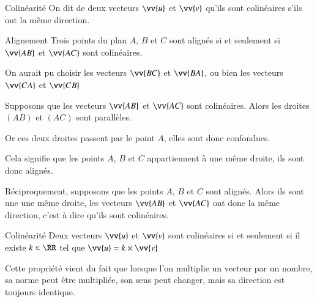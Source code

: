 \documentclass[oneside,12pt]{article}          %
\begin{document}
\begin{definition}{Colinéarité}
On dit de deux vecteurs $\vv{u}$ et $\vv{v}$ qu'ils sont colinéaires s'ils ont la même direction.
\end{definition}



\begin{minipage}{0.48\linewidth}
    \begin{propriete}{Alignement}
	    Trois points du plan $A$, $B$ et $C$ sont alignés si et seulement si $\vv{AB}$ et $\vv{AC}$ sont colinéaires.
    \end{propriete}
\end{minipage}\hspace{5mm}
\begin{minipage}{0.48\linewidth}
    \begin{remarque}
    On aurait pu choisir les vecteurs $\vv{BC}$ et $\vv{BA}$, ou bien les vecteurs $\vv{CA}$ et $\vv{CB}$
    \end{remarque}
\end{minipage}

\begin{demonstration}
	Supposons que les vecteurs $\vv{AB}$ et $\vv{AC}$ sont colinéaires. Alors les droites $(AB)$ et $(AC)$ sont parallèles. 
	
	Or ces deux droites passent par le point $A$, elles sont donc confondues. 
	
	Cela signifie que les points $A$, $B$ et $C$ appartiennent à une même droite, ils sont donc alignés.
	
	Réciproquement, supposons que les points $A$, $B$ et $C$ sont alignés. Alors ils sont une une même droite, les vecteurs $\vv{AB}$ et $\vv{AC}$ ont donc la même direction, c'est à dire qu'ils sont colinéaires.
\end{demonstration}

\begin{theoreme}{Colinéarité}
Deux vecteurs $\vv{u}$ et $\vv{v}$ sont colinéaires si et seulement si il existe $k\in\RR$ tel que $\vv{u}=k\times\vv{v}$
\end{theoreme}

\begin{remarque}
Cette propriété vient du fait que lorsque l'on multiplie un vecteur par un nombre, sa norme peut être multipliée, son sens peut changer, mais sa direction est toujours identique.
\end{remarque}
\end{document}
